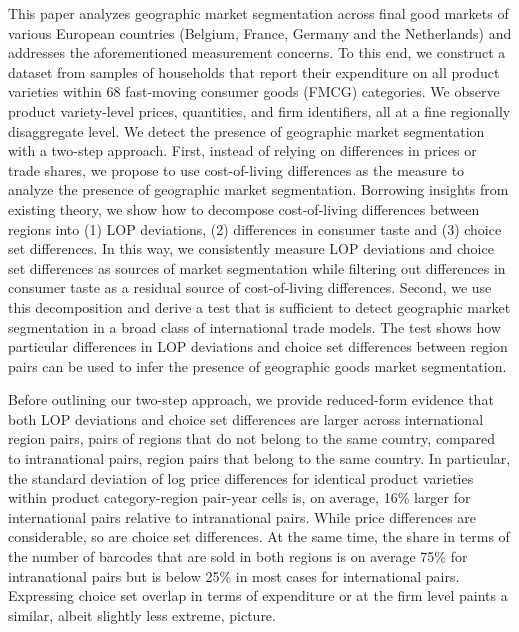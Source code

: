 This paper analyzes geographic market segmentation across final good markets of various European countries (Belgium, France, Germany and the Netherlands) and addresses the aforementioned measurement concerns. To this end, we construct a dataset from samples of households that report their expenditure on all product varieties within 68 fast-moving consumer goods (FMCG) categories. We observe product variety-level prices, quantities, and firm identifiers, all at a fine regionally disaggregate level. We detect the presence of geographic market segmentation with a two-step approach. First, instead of relying on differences in prices or trade shares, we propose to use cost-of-living differences as the measure to analyze the presence of geographic market segmentation. Borrowing insights from existing theory, we show how to decompose cost-of-living differences between regions into (1) LOP deviations, (2) differences in consumer taste and (3) choice set differences. In this way, we consistently measure LOP deviations and choice set differences as sources of market segmentation while filtering out differences in consumer taste as a residual source of cost-of-living differences. Second, we use this decomposition and derive a test that is sufficient to detect geographic market segmentation in a broad class of international trade models. The test shows how particular differences in LOP deviations and choice set differences between region pairs can be used to infer the presence of geographic goods market segmentation. 

Before outlining our two-step approach, we provide reduced-form evidence that both LOP deviations and choice set differences are larger across international region pairs, pairs of regions that do not belong to the same country, compared to intranational pairs, region pairs that belong to the same country. In particular, the standard deviation of log price differences for identical product varieties within product category-region pair-year cells is, on average, 16\% larger for international pairs relative to intranational pairs. While price differences are considerable, so are choice set differences. At the same time, the share in terms of the number of barcodes that are sold in both regions is on average 75\% for intranational pairs but is below 25\% in most cases for international pairs. Expressing choice set overlap in terms of expenditure or at the firm level paints a similar, albeit slightly less extreme, picture. 

